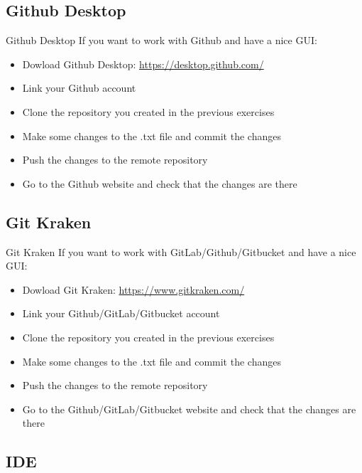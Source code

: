 \documentclass[show notes on second screen=right]{beamer}
\begin{document}
\subsection{Github Desktop}
\begin{frame}[t]{Github Desktop}
  If you want to work with Github and have a nice GUI:
  \begin{itemize}
    \item Dowload Github Desktop: \url{https://desktop.github.com/}
    \item Link your Github account
    \item Clone the repository you created in the previous exercises
    \item Make some changes to the .txt file and commit the changes
    \item Push the changes to the remote repository
    \item Go to the Github website and check that the changes are there
  \end{itemize}
\end{frame}

\subsection{Git Kraken}
\begin{frame}[t]{Git Kraken}
  If you want to work with GitLab/Github/Gitbucket and have a nice GUI:
  \begin{itemize}
    \item Dowload Git Kraken: \url{https://www.gitkraken.com/}
    \item Link your Github/GitLab/Gitbucket account
    \item Clone the repository you created in the previous exercises
    \item Make some changes to the .txt file and commit the changes
    \item Push the changes to the remote repository
    \item Go to the Github/GitLab/Gitbucket website and check that the changes are there
  \end{itemize}
\end{frame}

\subsection{IDE}
\end{document}
